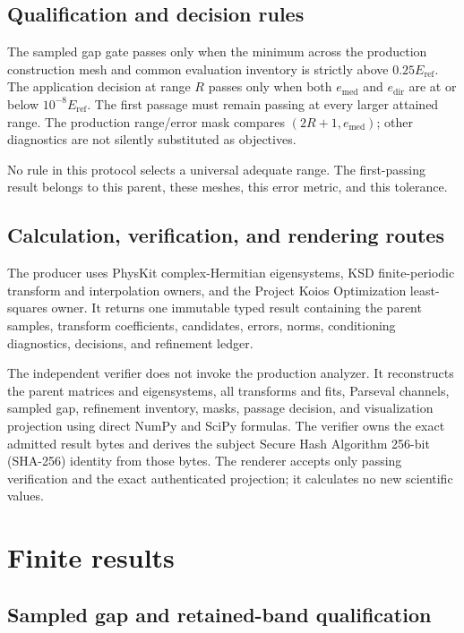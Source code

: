\documentclass[11pt]{article}
\newcommand{\eref}{E_{\mathrm{ref}}}
\begin{document}
\subsection{Qualification and decision rules}

The sampled gap gate passes only when the minimum across the production construction
mesh and common evaluation inventory is strictly above $0.25\eref$.  The application
decision at range $R$ passes only when both $e_{\mathrm{med}}$ and $e_{\mathrm{dir}}$ are
at or below $10^{-8}\eref$.  The first passage must remain passing at every larger
attained range.  The production range/error mask compares $(2R+1,e_{\mathrm{med}})$;
other diagnostics are not silently substituted as objectives.

No rule in this protocol selects a universal adequate range.  The first-passing result
belongs to this parent, these meshes, this error metric, and this tolerance.

\subsection{Calculation, verification, and rendering routes}

The producer uses PhysKit complex-Hermitian eigensystems, KSD finite-periodic transform
and interpolation owners, and the Project Koios Optimization least-squares owner.  It
returns one immutable typed result containing the parent samples, transform coefficients,
candidates, errors, norms, conditioning diagnostics, decisions, and refinement ledger.

The independent verifier does not invoke the production analyzer.  It reconstructs the
parent matrices and eigensystems, all transforms and fits, Parseval channels, sampled gap,
refinement inventory, masks, passage decision, and visualization projection using direct
NumPy and SciPy formulas.  The verifier owns the exact admitted result bytes and derives
the subject Secure Hash Algorithm 256-bit (SHA-256) identity from those bytes.  The
renderer accepts only passing verification and the exact authenticated projection; it
calculates no new scientific values.

\section{Finite results}

\subsection{Sampled gap and retained-band qualification}
\end{document}
